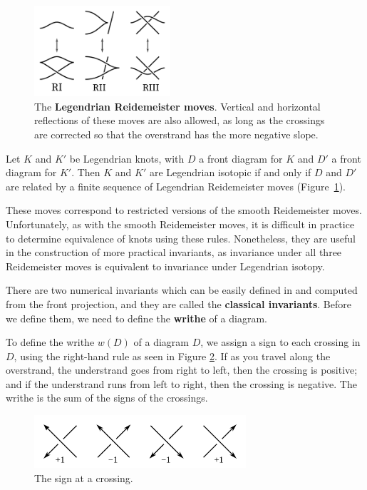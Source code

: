 \begin{figure}[ht]
    \centering
    \includegraphics[width=0.45\textwidth]{images/redeimeister.pdf}
    \caption{The \textbf{Legendrian Reidemeister moves}. Vertical and horizontal reflections of these moves are also allowed, as long as the crossings are corrected so that the overstrand has the more negative slope.}%
    \label{fig:redemeister}
\end{figure}

\begin{theorem}
    Let $K$ and $K'$ be Legendrian knots, with $D$ a front diagram for $K$ and $D'$ a front diagram for $K'$.
    Then $K$ and $K'$ are Legendrian isotopic if and only if $D$ and $D'$ are related by a finite sequence of Legendrian Reidemeister moves (Figure~\ref{fig:redemeister}).
\end{theorem}

These moves correspond to restricted versions of the smooth Reidemeister moves.
Unfortunately, as with the smooth Reidemeister moves, it is difficult in practice to determine equivalence of knots using these rules. Nonetheless, they are useful in the construction of more practical invariants, as invariance under all three Reidemeister moves is equivalent to invariance under Legendrian isotopy.


There are two numerical invariants which can be easily defined in and computed from the front projection, and they are called the \textbf{classical invariants}. Before we define them, we need to define the \textbf{writhe} of a diagram.

To define the writhe $w(D)$ of a diagram $D$, we assign a sign to each crossing in $D$, using the right-hand rule as seen in Figure \ref{fig:writhe}.
If as you travel along the overstrand, the understrand goes from right to left, then the crossing is positive; and if the understrand runs from left to right, then the crossing is negative. 
The writhe is the sum of the signs of the crossings.

\begin{figure}[ht]
    \centering
    \includegraphics[width=0.7\textwidth]{images/writhe.pdf}
    \caption{The sign at a crossing.}
    \label{fig:writhe}
\end{figure}

